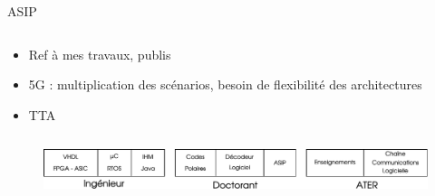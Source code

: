 \documentclass[t,compress,mathserif,12pt,xcolor=dvipsnames]{beamer}
\begin{document}
\begin{frame}[t]{ASIP}
  \begin{minipage}[t][5.0cm][t]{\textwidth}
    \begin{columns}
      \begin{column}{0.63\textwidth}
        \vspace{-30pt}
        \begin{itemize}
          \item Ref à mes travaux, publis
          \item 5G : multiplication des scénarios, besoin de flexibilité des architectures
          \item TTA
        \end{itemize}
      \end{column}
      \begin{column}{0.04\textwidth}

      \end{column}
      \begin{column}{0.33\textwidth}
      \end{column}
    \end{columns}
  \end{minipage}
  \begin{figure}[htp]
    \centering
    \includegraphics[width=\textwidth]{fig/frise}
  \end{figure}

\end{frame}
\end{document}
